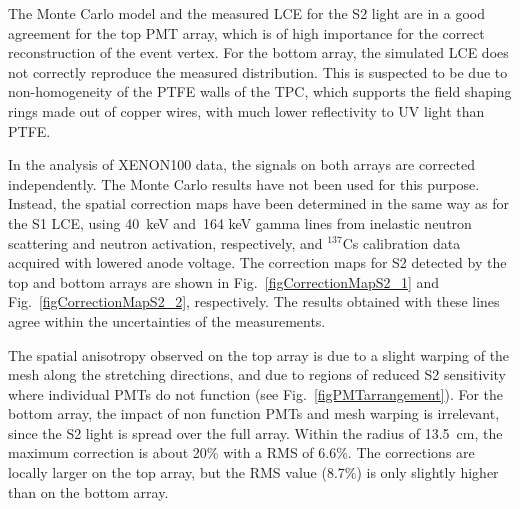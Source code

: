 The Monte Carlo model and the measured LCE for the S2 light are in a good agreement for the top PMT array, which is of high importance for the correct reconstruction of the event vertex. For the bottom array, the simulated LCE does not correctly reproduce the measured distribution. This is suspected to be due to non-homogeneity of the PTFE walls of the TPC, which supports the field shaping rings made out of copper wires, with much lower reflectivity to UV light than PTFE.

In the analysis of XENON100 data, the signals on both arrays are corrected independently. The Monte Carlo results have not been used for this purpose. Instead, the spatial correction maps have been determined in the same way as for the S1 LCE, using 40~keV and~164 keV gamma lines from inelastic neutron scattering and neutron activation, respectively, and $^{137}$Cs calibration data acquired with lowered anode voltage. The correction maps for S2 detected by the top and bottom arrays are shown in Fig.~\ref{figCorrectionMapS2_1} and Fig.~\ref{figCorrectionMapS2_2}, respectively. 
The results obtained with these lines agree within the uncertainties of the measurements.

The spatial anisotropy observed on the top array is due to a slight warping of the mesh along the stretching directions, and due to regions of reduced S2 sensitivity where individual PMTs do not function (see Fig.~\ref{figPMTarrangement}). For the bottom array, the impact of non function PMTs and mesh warping is irrelevant, since the S2 light is spread over the full array. Within the radius of 13.5~cm, the maximum correction is about 20\% with a RMS of 6.6\%. The corrections are locally larger on the top array, but the RMS value (8.7\%) is only slightly higher than on the bottom array. 

